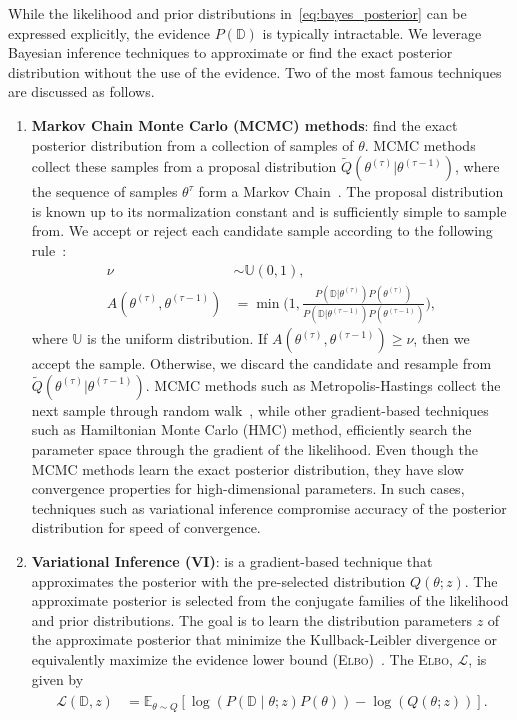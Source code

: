 While the likelihood and prior distributions in~\eqref{eq:bayes_posterior} can
be expressed explicitly, the evidence $P(\mathbb{D})$ is typically intractable.
We leverage Bayesian inference techniques to approximate or find the exact
posterior distribution without the use of the evidence. Two of the most famous
techniques are discussed as follows.
\begin{enumerate}
  \item \textbf{Markov Chain Monte Carlo (MCMC) methods}: find the exact
  posterior distribution from a collection of samples of $\theta$.
  MCMC methods collect these samples from a proposal distribution
  $\tilde{Q}(\theta^{(\tau)} | \theta^{(\tau-1)})$, where the sequence of
  samples $\theta^\tau$ form a Markov Chain~\cite{bishop2006pattern}.
  The proposal distribution is known up to its normalization constant and is
  sufficiently simple to sample from. 
  We accept or reject each candidate sample according to the following rule~\cite{bishop2006pattern}:
  \begin{align*}
    \nu &\sim \mathbb{U}(0, 1), \\
    A(\theta^{(\tau)}, \theta^{(\tau-1)}) &= \min \Biggl(1, \frac{P(\mathbb{D} | \theta^{(\tau)})P(\theta^{(\tau)})}{P(\mathbb{D} | \theta^{(\tau-1)})P(\theta^{(\tau-1)})} \Biggr),
  \end{align*}
  \noindent where $\mathbb{U}$ is the uniform distribution. If
  $A(\theta^{(\tau)}, \theta^{(\tau-1)}) \geq \nu$, then we accept the sample. 
  Otherwise, we discard the candidate and resample from $\tilde{Q}(\theta^{(\tau)} |
  \theta^{(\tau-1)})$.
  MCMC methods such as Metropolis-Hastings collect the next sample through
  random walk~\cite{gilks1995markov}, while other gradient-based techniques such
  as Hamiltonian Monte Carlo (HMC) method, efficiently search the
  parameter space through the gradient of the likelihood.
  Even though the MCMC methods learn the exact posterior distribution, they have
  slow convergence properties for high-dimensional parameters. In such cases,
  techniques such as variational inference compromise accuracy of the posterior
  distribution for speed of convergence.
  
\item \textbf{Variational Inference (VI)}: is a gradient-based technique that approximates the posterior with the pre-selected
distribution $Q(\theta;z)$.
%
The approximate posterior is selected from the conjugate families of the
likelihood and prior distributions. The goal is to learn the distribution
parameters $z$ of the approximate posterior that minimize the Kullback-Leibler
divergence or equivalently maximize the evidence lower bound
(\textsc{Elbo})~\cite{cohen2016bayesian}. The \textsc{Elbo}, $\mathcal{L}$, is
given by
\begin{align}
  \begin{split}
  \mathcal{L}(\mathbb{D},z) &= \mathbb{E}_{\theta \sim Q} \left[\log(P(\mathbb{D} \mid \theta;z)P(\theta)) - \log(Q(\theta;z)) \right].
  \end{split}
  \label{eq:elbo}
\end{align}
\end{enumerate}


